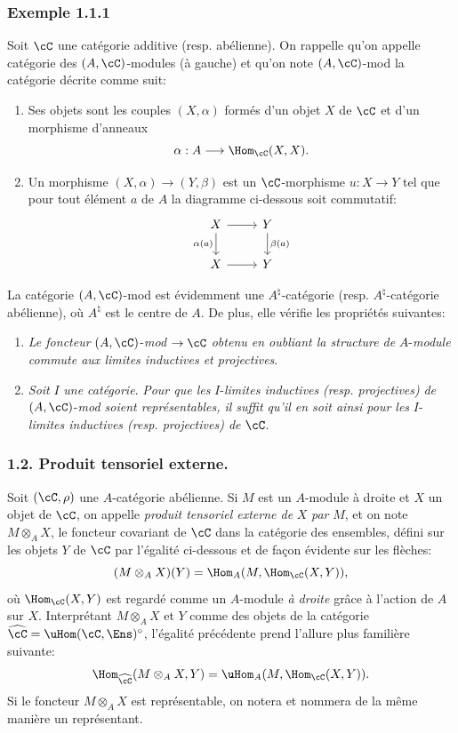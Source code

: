 \subsubsection*{Exemple 1.1.1}
Soit $\cC$ une catégorie additive (resp. abélienne). On rappelle qu'on appelle catégorie des $(A,\cC)$-modules (à gauche) et qu'on note $(A,\cC)$-mod la catégorie décrite comme suit:
\begin{enumerate}[label=(\roman*)]
\item Ses
objets sont les couples $(X,\alpha)$ formés d'un objet $X$ de $\cC$ et d'un morphisme d'anneaux
\[
\alpha:A\longrightarrow \Hom_{\cC}(X,X).
\]
\item Un morphisme $(X,\alpha)\to(Y,\beta)$ est un $\cC$-morphisme $u:X\to Y$ tel que pour tout élément $a$ de $A$ la diagramme ci-dessous soit commutatif:
\[
\begin{tikzcd}
X \arrow[r] \arrow[d,"\alpha(a)"'] & Y \arrow[d,"\beta(a)"]\\
X \arrow[r] & Y
\end{tikzcd}
\]
\end{enumerate}
La catégorie $(A,\cC)$-mod est évidemment une $A^{\natural}$-catégorie (resp. $A^{\natural}$-catégorie abélienne), où $A^{\natural}$ est le centre de $A$. De plus, elle vérifie les propriétés suivantes:
\begin{enumerate}[label=(\alph*)]
\item \emph{Le foncteur} $(A,\cC)$-\emph{mod} $\to\cC$ \emph{obtenu en oubliant la structure de} $A$-\emph{module commute aux limites inductives et projectives}.
\item \emph{Soit} $I$ \emph{une catégorie}. \emph{Pour que les} $I$-\emph{limites inductives} \emph{(resp. projectives)} \emph{de} $(A,\cC)$-\emph{mod soient représentables, il suffit qu'il en soit ainsi pour les} $I$-\emph{limites inductives (resp. projectives) de} $\cC$.
\end{enumerate}

\subsubsection*{1.2. Produit tensoriel externe.}
Soit $(\cC,\rho)$ une $A$-catégorie abélienne. Si $M$ est un $A$-module à droite et $X$ un objet de $\cC$, on appelle \emph{produit tensoriel externe de} $X$ \emph{par} $M$, et on note $M\otimes_A X$, le foncteur covariant de $\cC$ dans la catégorie des ensembles, défini sur les objets $Y$ de $\cC$ par l'égalité ci-dessous et de façon évidente sur les flèches:
\[
(M\otimes_A X)(Y)=\Hom_A(M,\Hom_{\cC}(X,Y)),
\]
où $\Hom_{\cC}(X,Y)$ est regardé comme un $A$-module \emph{à droite} grâce à l'action de $A$ sur $X$. Interprétant $M\otimes_AX$ et $Y$ comme des objets de la catégorie $\widehat{\cC}=\uHom(\cC,\Ens)^{\circ}$, l'égalité précédente prend l'allure plus familière
suivante:
\[
\Hom_{\widehat{\cC}}(M\otimes_A X,Y)=\uHom_A(M,\Hom_{\cC}(X,Y)).
\]
Si le foncteur $M\otimes_A X$ est représentable, on notera et nommera de la même manière un représentant.

